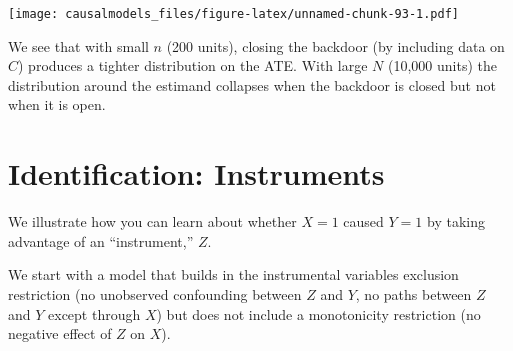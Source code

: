 \documentclass[
  12pt,
]{book}
\newenvironment{Shaded}{\begin{snugshade}}{\end{snugshade}}
\newcommand{\CommentTok}[1]{\textcolor[rgb]{0.56,0.35,0.01}{\textit{#1}}}
\newcommand{\DataTypeTok}[1]{\textcolor[rgb]{0.13,0.29,0.53}{#1}}
\newcommand{\DecValTok}[1]{\textcolor[rgb]{0.00,0.00,0.81}{#1}}
\newcommand{\KeywordTok}[1]{\textcolor[rgb]{0.13,0.29,0.53}{\textbf{#1}}}
\newcommand{\NormalTok}[1]{#1}
\newcommand{\OperatorTok}[1]{\textcolor[rgb]{0.81,0.36,0.00}{\textbf{#1}}}
\newcommand{\OtherTok}[1]{\textcolor[rgb]{0.56,0.35,0.01}{#1}}
\newcommand{\StringTok}[1]{\textcolor[rgb]{0.31,0.60,0.02}{#1}}
\begin{document}
\begin{Shaded}
\end{Shaded}

\texttt{[image: causalmodels\_files/figure-latex/unnamed-chunk-93-1.pdf]}

We see that with small \(n\) (200 units), closing the backdoor (by including data on \(C\)) produces a tighter distribution on the ATE. With large \(N\) (10,000 units) the distribution around the estimand collapses when the backdoor is closed but not when it is open.

\hypertarget{identification-instruments}{%
\section{Identification: Instruments}\label{identification-instruments}}

We illustrate how you can learn about whether \(X=1\) caused \(Y=1\) by taking advantage of an ``instrument,'' \(Z\).

We start with a model that builds in the instrumental variables exclusion restriction (no unobserved confounding between \(Z\) and \(Y\), no paths between \(Z\) and \(Y\) except through \(X\)) but does not include a monotonicity restriction (no negative effect of \(Z\) on \(X\)).

\begin{Shaded}
\end{Shaded}
\end{document}
